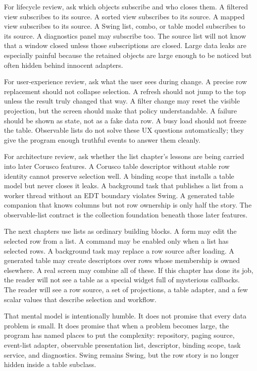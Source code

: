 For lifecycle review, ask which objects subscribe and who closes them. A
filtered view subscribes to its source. A sorted view subscribes to its source. A
mapped view subscribes to its source. A Swing list, combo, or table model
subscribes to its source. A diagnostics panel may subscribe too. The source list
will not know that a window closed unless those subscriptions are closed. Large
data leaks are especially painful because the retained objects are large enough
to be noticed but often hidden behind innocent adapters.

For user-experience review, ask what the user sees during change. A precise row
replacement should not collapse selection. A refresh should not jump to the top
unless the result truly changed that way. A filter change may reset the visible
projection, but the screen should make that policy understandable. A failure
should be shown as state, not as a fake data row. A busy load should not freeze
the table. Observable lists do not solve these UX questions automatically; they
give the program enough truthful events to answer them cleanly.

For architecture review, ask whether the list chapter's lessons are being
carried into later Corusco features. A Corusco table descriptor without stable
row identity cannot preserve selection well. A binding scope that installs a
table model but never closes it leaks. A background task that publishes a list
from a worker thread without an EDT boundary violates Swing. A generated table
companion that knows columns but not row ownership is only half the story. The
observable-list contract is the collection foundation beneath those later
features.

The next chapters use lists as ordinary building blocks. A form may edit the
selected row from a list. A command may be enabled only when a list has selected
rows. A background task may replace a row source after loading. A generated table
may create descriptors over rows whose membership is owned elsewhere. A real
screen may combine all of these. If this chapter has done its job, the reader
will not see a table as a special widget full of mysterious callbacks. The
reader will see a row source, a set of projections, a table adapter, and a few
scalar values that describe selection and workflow.

That mental model is intentionally humble. It does not promise that every data
problem is small. It does promise that when a problem becomes large, the program
has named places to put the complexity: repository, paging source, event-list
adapter, observable presentation list, descriptor, binding scope, task service,
and diagnostics. Swing remains Swing, but the row story is no longer hidden
inside a table subclass.

